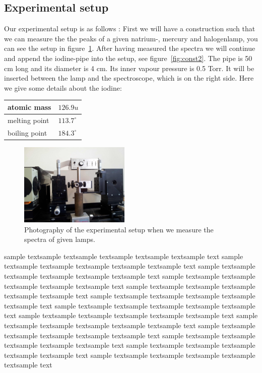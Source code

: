 \subsection{Experimental setup}
Our experimental setup is as follows \cite{versuchsanleitung}:
First we will have a construction such that we can measure the 
the peaks of a given natrium-, mercury and halogenlamp, you 
can see the setup in figure~\ref{fig:const1}.
After having measured the spectra we will continue and append
the iodine-pipe into the setup, see figure~\ref{fig:const2}.
The pipe is 50 cm long and its diameter is 4 cm. Its inner 
vapour pressure is 0.5 Torr. It will be 
inserted between the lamp and the spectroscope, which is on 
the right side. Here we give some details about the iodine:
\begin{tabular}{| l | l |}
    \hline
    atomic mass   & $126.9 u$ \\
    \hline
    melting point & $113.7^{\circ}$ \\
    \hline
    boiling point & $184.3^{\circ}$
\end{tabular}
\begin{figure}
  \begin{center}
    \includegraphics[width=0.47\textwidth]{pics/const1}
  \end{center}
\caption{Photography of the experimental setup when we measure
    the spectra of given lamps.} 
  \vspace{-10pt}
 \label{fig:const1}

\end{figure}
sample textsample textsample textsample textsample textsample text
sample textsample textsample textsample textsample textsample text
sample textsample textsample textsample textsample textsample text
sample textsample textsample textsample textsample textsample text
sample textsample textsample textsample textsample textsample text
sample textsample textsample textsample textsample textsample text
sample textsample textsample textsample textsample textsample text
sample textsample textsample textsample textsample textsample text
sample textsample textsample textsample textsample textsample text
sample textsample textsample textsample textsample textsample text
sample textsample textsample textsample textsample textsample text
sample textsample textsample textsample textsample textsample text
sample textsample textsample textsample textsample textsample text

